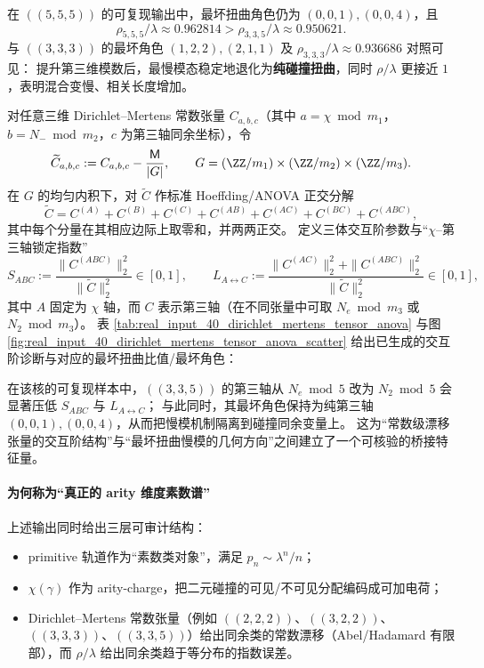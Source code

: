 \begin{remark}[纯碰撞慢模的普适性与混合变慢]\label{cor:arity-555-collision-universal}
在 $((5,5,5))$ 的可复现输出中，最坏扭曲角色仍为 $(0,0,1),(0,0,4)$，且
\[
\rho_{5,5,5}/\lambda\approx 0.962814> \rho_{3,3,5}/\lambda\approx 0.950621.
\]
与 $((3,3,3))$ 的最坏角色 $(1,2,2),(2,1,1)$ 及 $\rho_{3,3,3}/\lambda\approx 0.936686$ 对照可见：
提升第三维模数后，最慢模态稳定地退化为\textbf{纯碰撞扭曲}，同时 $\rho/\lambda$ 更接近 $1$，表明混合变慢、相关长度增加。
\end{remark}

\begin{remark}\label{rem:dirichlet-mertens-anova-fingerprint}
对任意三维 Dirichlet--Mertens 常数张量 \(C_{a,b,c}\)（其中 \(a=\chi\bmod m_1\)，\(b=N_-\bmod m_2\)，\(c\) 为第三轴同余坐标），令
$$
\widetilde C_{a,b,c}:=C_{a,b,c}-\frac{\mathsf{M}}{|G|},
\qquad
G=(\ZZ/m_1)\times(\ZZ/m_2)\times(\ZZ/m_3).
$$
在 \(G\) 的均匀内积下，对 \(\widetilde C\) 作标准 Hoeffding/ANOVA 正交分解
$$
\widetilde C
=C^{(A)}+C^{(B)}+C^{(C)}+C^{(AB)}+C^{(AC)}+C^{(BC)}+C^{(ABC)},
$$
其中每个分量在其相应边际上取零和，并两两正交。
定义三体交互阶参数与“\(\chi\)--第三轴锁定指数”
$$
S_{ABC}:=\frac{\|C^{(ABC)}\|_2^2}{\|\widetilde C\|_2^2}\in[0,1],
\qquad
L_{A\leftrightarrow C}:=\frac{\|C^{(AC)}\|_2^2+\|C^{(ABC)}\|_2^2}{\|\widetilde C\|_2^2}\in[0,1],
$$
其中 \(A\) 固定为 \(\chi\) 轴，而 \(C\) 表示第三轴（在不同张量中可取 \(N_e\bmod m_3\) 或 \(N_2\bmod m_3\)）。
表 \ref{tab:real_input_40_dirichlet_mertens_tensor_anova} 与图 \ref{fig:real_input_40_dirichlet_mertens_tensor_anova_scatter} 给出已生成的交互阶诊断与对应的最坏扭曲比值/最坏角色：


\par
在该核的可复现样本中，\(((3,3,5))\) 的第三轴从 \(N_e\bmod 5\) 改为 \(N_2\bmod 5\) 会显著压低 \(S_{ABC}\) 与 \(L_{A\leftrightarrow C}\)；
与此同时，其最坏角色保持为纯第三轴 \((0,0,1),(0,0,4)\)，从而把慢模机制隔离到碰撞同余变量上。
这为“常数级漂移张量的交互阶结构”与“最坏扭曲慢模的几何方向”之间建立了一个可核验的桥接特征量。
\end{remark}

\paragraph{为何称为“真正的 arity 维度素数谱”}
上述输出同时给出三层可审计结构：
\begin{itemize}
  \item primitive 轨道作为“素数类对象”，满足 $p_n\sim \lambda^n/n$；
\item $\chi(\gamma)$ 作为 arity-charge，把二元碰撞的可见/不可见分配编码成可加电荷；
  \item Dirichlet--Mertens 常数张量（例如 \(((2,2,2))\)、\(((3,2,2))\)、\(((3,3,3))\)、\(((3,3,5))\)）给出同余类的常数漂移（Abel/Hadamard 有限部），而 $\rho/\lambda$ 给出同余类趋于等分布的指数误差。
\end{itemize}
